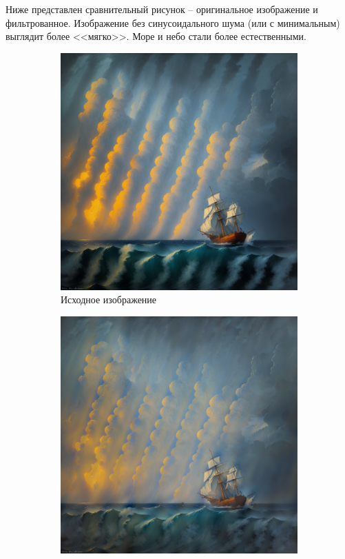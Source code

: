 \documentclass[a4paper, 12pt]{article}
\begin{document}
    Ниже представлен сравнительный рисунок -- оригинальное изображение и фильтрованное.
    Изображение без синусоидального шума (или с минимальным) выглядит более <<мягко>>.
    Море и небо стали более естественными.
    \begin{figure}[H]
        \centering
        \begin{subfigure}{0.45\textwidth}
            \centering
            \includegraphics[width=\linewidth]{4.png}
            \caption{Исходное изображение}
            \label{fig:old}
        \end{subfigure}
        \begin{subfigure}{0.45\textwidth}
            \centering
            \includegraphics[width=\linewidth]{new4.png}

\end{subfigure}
\end{figure}
\end{document}
